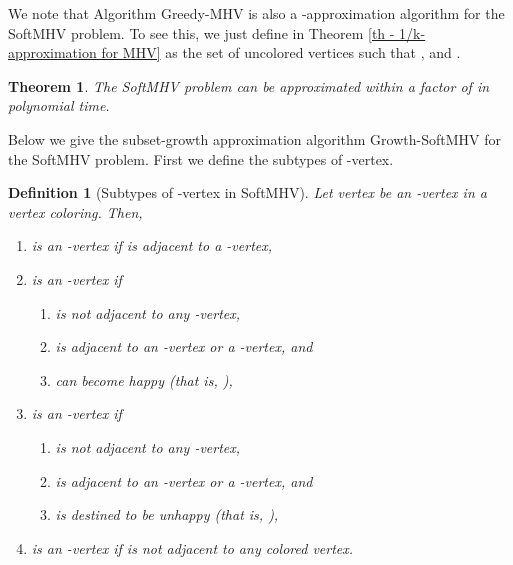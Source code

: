 \documentclass[11pt]{article}
\newtheorem{theorem}{Theorem}[section]
\newtheorem{definition}{Definition}[section]
\newcommand{\qed}{\vrule height4pt width4pt depth2pt}
\begin{document}
We note that Algorithm {\sc Greedy-MHV} is also a -approximation
algorithm for the SoftMHV problem. To see this, we just define 
in Theorem \ref{th - 1/k-approximation for MHV} as the set of uncolored
vertices  such that ,
and .

\begin{theorem}
The SoftMHV problem can be approximated within a factor of 
in polynomial time. \qed
\end{theorem}

Below we give the subset-growth approximation algorithm {\sc Growth-SoftMHV}
for the SoftMHV problem. First we define the subtypes of -vertex.

\begin{definition}[Subtypes of -vertex in SoftMHV]
Let vertex  be an -vertex in a vertex coloring. Then,
\begin{enumerate}
\item  is an -vertex if  is adjacent to a -vertex,

\item  is an -vertex if
\begin{enumerate}
\item  is not adjacent to any -vertex,
\item  is adjacent to an -vertex or a -vertex, and
\item  can become happy (that is,
),
\end{enumerate}

\item  is an -vertex if
\begin{enumerate}
\item  is not adjacent to any -vertex,
\item  is adjacent to an -vertex or a -vertex, and
\item  is destined to be unhappy (that is,
),
\end{enumerate}

\item  is an -vertex if  is not adjacent to any colored
vertex.
\end{enumerate}
\end{definition}
\end{document}
